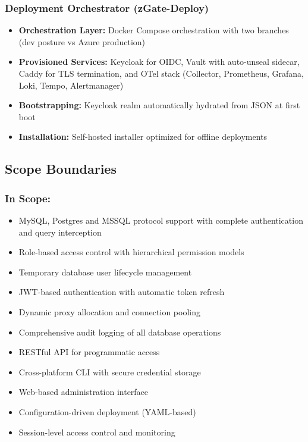 \subsubsection{Deployment Orchestrator (zGate-Deploy)}
\begin{itemize}
    \item \textbf{Orchestration Layer:} Docker Compose orchestration with two branches (dev posture vs Azure production)
    \item \textbf{Provisioned Services:} Keycloak for OIDC, Vault with auto-unseal sidecar, Caddy for TLS termination, and OTel stack (Collector, Prometheus, Grafana, Loki, Tempo, Alertmanager)
    \item \textbf{Bootstrapping:} Keycloak realm automatically hydrated from JSON at first boot
    \item \textbf{Installation:} Self-hosted installer optimized for offline deployments
\end{itemize}

\subsection{Scope Boundaries}

\subsubsection{In Scope:}
\begin{itemize}
    \item MySQL, Postgres and MSSQL protocol support with complete authentication and query interception
    \item Role-based access control with hierarchical permission models
    \item Temporary database user lifecycle management
    \item JWT-based authentication with automatic token refresh
    \item Dynamic proxy allocation and connection pooling
    \item Comprehensive audit logging of all database operations
    \item RESTful API for programmatic access
    \item Cross-platform CLI with secure credential storage
    \item Web-based administration interface
    \item Configuration-driven deployment (YAML-based)
    \item Session-level access control and monitoring
\end{itemize}

